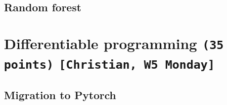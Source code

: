 \documentclass[a4paper,12pt]{article}
\newcommand{\authorpoints}[2]{{\large \texttt{(#2 points)} \texttt{[#1]}}}
\begin{document}
    \subsection{Random forest} %







\section{Differentiable programming \authorpoints{Christian, W5 Monday}{35}}
    \subsection{Migration to Pytorch} %

    








\end{document}
